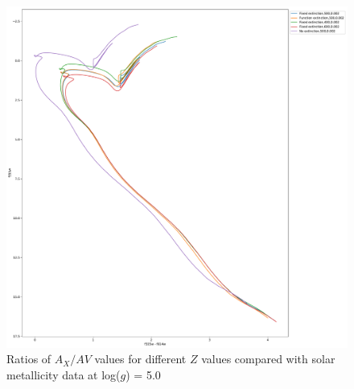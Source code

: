 \documentclass[12pt, a4paper]{report}
\begin{document}
\begin{figure}[h]
\begin{center}
\includegraphics[scale=0.3]{../basti_isochrones_10_13Gyr/Extinction_T50k_FeH0fix_func_f555w_f555wmf814w_500_400_600_Myr_FeH_0p002_ref_noext_Av_1p0.pdf}
\caption{Ratios of $A_{X}/A{V}$ values for different $Z$ values compared with solar metallicity data at log($g$) = 5.0}
\label{wfc3_isoc1_T50k}
\end{center}
\end{figure}
\end{document}
